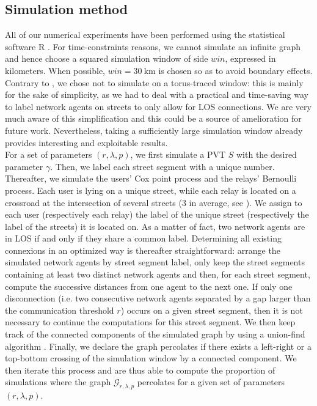 \documentclass[conference]{IEEEtran}
\begin{document}
\subsection{Simulation method}
All of our numerical experiments have been performed using the statistical software R \cite{team2014r}. For time-constraints reasons, we cannot simulate an infinite graph and hence choose a squared simulation window of side $win$, expressed in kilometers. When possible, $win = 30 \: \text{km}$ is chosen so as to avoid boundary effects. Contrary to \cite{cali2018percolation,mertens_continuum_2012}, we chose not to simulate on a torus-traced window: this is mainly for the sake of simplicity, as we had to deal with a practical and time-saving way to label network agents on streets to only allow for LOS connections. We are very much aware of this simplification and this could be a source of amelioration for future work. Nevertheless, taking a sufficiently large simulation window already provides interesting and exploitable results.\\
\indent For a set of parameters $(r,\lambda,p)$, we first simulate a PVT $S$ with the desired parameter $\gamma$. Then, we label each street segment with a unique number. Thereafter, we simulate the users' Cox point process and the relays' Bernoulli process. Each user is lying on a unique street, while each relay is located on a crossroad at the intersection of several streets (3 in average, see \cite{okabe_spatial_1992,chiu_stochastic_2013,blaszczyszyn_stochastic_2018}). We assign to each user (respectively each relay) the label of the unique street (respectively the label of the streets) it is located on. As a matter of fact, two network agents are in LOS if and only if they share a common label. Determining all existing connexions in an optimized way is thereafter straightforward: arrange the simulated network agents by street segment label, only keep the street segments containing at least two distinct network agents and then, for each street segment, compute the successive distances from one agent to the next one. If only one disconnection (i.e. two consecutive network agents separated by a gap larger than the communication threshold $r$) occurs on a given street segment, then it is not necessary to continue the computations for this street segment. We then keep track of the connected components of the simulated graph by using a union-find algorithm \cite{knuthart,sedgewick2011algorithms,newman2001fast}. Finally, we declare the graph percolates if there exists a left-right or a top-bottom crossing of the simulation window by a connected component. We then iterate this process and are thus able to compute the proportion of simulations where the graph $\mathcal{G}_{r,\lambda,p}$ percolates for a given set of parameters $(r,\lambda,p)$.  \\
\end{document}
